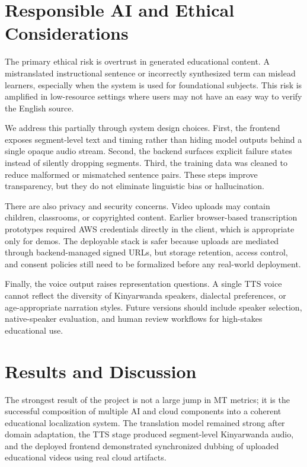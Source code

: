 \documentclass[conference]{IEEEtran}
\begin{document}
\section{Responsible AI and Ethical Considerations}
The primary ethical risk is overtrust in generated educational content. A mistranslated instructional sentence or incorrectly synthesized term can mislead learners, especially when the system is used for foundational subjects. This risk is amplified in low-resource settings where users may not have an easy way to verify the English source.

We address this partially through system design choices. First, the frontend exposes segment-level text and timing rather than hiding model outputs behind a single opaque audio stream. Second, the backend surfaces explicit failure states instead of silently dropping segments. Third, the training data was cleaned to reduce malformed or mismatched sentence pairs. These steps improve transparency, but they do not eliminate linguistic bias or hallucination.

There are also privacy and security concerns. Video uploads may contain children, classrooms, or copyrighted content. Earlier browser-based transcription prototypes required AWS credentials directly in the client, which is appropriate only for demos. The deployable stack is safer because uploads are mediated through backend-managed signed URLs, but storage retention, access control, and consent policies still need to be formalized before any real-world deployment.

Finally, the voice output raises representation questions. A single TTS voice cannot reflect the diversity of Kinyarwanda speakers, dialectal preferences, or age-appropriate narration styles. Future versions should include speaker selection, native-speaker evaluation, and human review workflows for high-stakes educational use.

\section{Results and Discussion}
The strongest result of the project is not a large jump in MT metrics; it is the successful composition of multiple AI and cloud components into a coherent educational localization system. The translation model remained strong after domain adaptation, the TTS stage produced segment-level Kinyarwanda audio, and the deployed frontend demonstrated synchronized dubbing of uploaded educational videos using real cloud artifacts.
\end{document}
